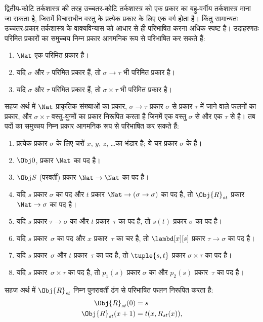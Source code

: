 \documentclass[../../../include/open-logic-section]{subfiles}
\begin{document}
द्वितीय-कोटि तर्कशास्त्र की तरह उच्चतर-कोटि तर्कशास्त्र को एक प्रकार का
बहु-वर्गीय तर्कशास्त्र माना जा सकता है, जिसमें विचाराधीन वस्तु के प्रत्येक
प्रकार के लिए एक वर्ग होता है। किंतु सामान्यतः उच्चतर-प्रकार तर्कशास्त्र के
वाक्यविन्यास को आधार से ही परिभाषित करना अधिक स्पष्ट है। उदाहरणतः परिमित
प्रकारों का समुच्चय निम्न प्रकार आगमनिक रूप से परिभाषित कर सकते हैं:
\begin{enumerate}
\item $\Nat$ एक परिमित प्रकार है।
\item यदि $\sigma$ और $\tau$ परिमित प्रकार हैं, तो $\sigma
  \to \tau$ भी
  परिमित प्रकार है।
\item यदि $\sigma$ और $\tau$ परिमित प्रकार हैं, तो $\sigma \times
  \tau$ भी
  परिमित प्रकार है।
\end{enumerate}
सहज अर्थ में $\Nat$ प्राकृतिक संख्याओं का प्रकार, $\sigma \to \tau$ प्रकार
$\sigma$ से प्रकार $\tau$ में जाने वाले फलनों का प्रकार, और $\sigma \times \tau$
वस्तु-युग्मों का प्रकार निरूपित करता है जिनमें एक वस्तु $\sigma$ से
और एक $\tau$ से है। तब पदों का समुच्चय निम्न प्रकार आगमनिक रूप से परिभाषित
कर सकते हैं:
\begin{enumerate}
\item प्रत्येक प्रकार $\sigma$ के लिए चरों $x$, $y$, $z$, \dots का भंडार है;
  ये चर प्रकार $\sigma$ के हैं।
\item $\Obj 0$, प्रकार $\Nat$ का पद है।
\item $\Obj S$ (परवर्ती) प्रकार $\Nat \to \Nat$ का पद है।
\item यदि $s$ प्रकार $\sigma$ का पद और $t$ प्रकार $\Nat \to (\sigma \to \sigma)$
  का पद है, तो $\Obj{R}_{st}$ प्रकार $\Nat \to \sigma$ का पद है।
\item यदि $s$ प्रकार $\tau \to \sigma$ का और $t$ प्रकार~$\tau$ का पद है,
  तो $s(t)$ प्रकार $\sigma$ का पद है।
\item यदि $s$ प्रकार~$\sigma$ का पद और $x$ प्रकार~$\tau$ का चर है, तो
  $\lambd[x][s]$ प्रकार $\tau \to \sigma$ का पद है।
\item यदि $s$ प्रकार~$\sigma$ और $t$ प्रकार~$\tau$ का पद है, तो
  $\tuple{s, t}$ प्रकार $\sigma \times
  \tau$ का पद है।
\item यदि $s$ प्रकार~$\sigma \times \tau$ का पद है, तो $p_1(s)$ प्रकार
  $\sigma$ का और $p_2(s)$ प्रकार~$\tau$ का पद है।
\end{enumerate}
सहज अर्थ में $\Obj{R}_{st}$ निम्न पुनरावर्ती ढंग से परिभाषित फलन निरूपित करता है:
\begin{align*}
\Obj{R}_{st}(0) & = s \\
\Obj{R}_{st}(x+1) & = t(x, R_{st}(x)),
\end{align*}
\end{document}
